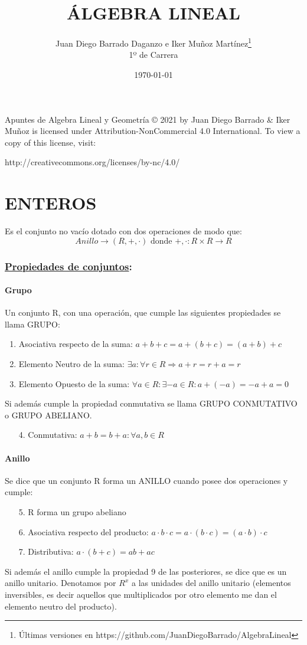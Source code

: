 \documentclass[10pt,a4paper,openright]{book}
\title{ÁLGEBRA LINEAL}
\author{Juan Diego Barrado Daganzo e Iker Muñoz Martínez\footnote{Últimas versiones en https://github.com/JuanDiegoBarrado/AlgebraLineal}\\1º de Carrera} %
\date{\today}
\begin{document}
\maketitle

Apuntes de Algebra Lineal y Geometría © 2021 by Juan Diego Barrado & Iker Muñoz is licensed under Attribution-NonCommercial 4.0 International. To view a copy of this license, visit:
\begin{center}
http://creativecommons.org/licenses/by-nc/4.0/
\end{center}

\mainmatter
\chapter*{ENTEROS}
Es el conjunto no vacío dotado con dos operaciones de modo que:
$$Anillo \rightarrow (R,+,\cdot)\mbox{ donde }+,\cdot : R\times R \rightarrow R$$
\subsection*{\underline{Propiedades de conjuntos}:}
\subsubsection*{Grupo}
Un conjunto R, con una operación, que cumple las siguientes propiedades se llama GRUPO:
\begin{enumerate}
\item Asociativa respecto de la suma: $a+b+c=a+(b+c)=(a+b)+c$
\item Elemento Neutro de la suma: $\exists a : \forall r \in R \Rightarrow a+r=r+a=r$
\item Elemento Opuesto de la suma: $\forall a \in R : \exists -a\in R : a+(-a)=-a+a=0$
\end{enumerate}
Si además cumple la propiedad conmutativa se llama GRUPO CONMUTATIVO o GRUPO ABELIANO.
\begin{enumerate}
\item[4.] Conmutativa: $a+b=b+a: \forall a,b\in R $
\end{enumerate}

\subsubsection*{Anillo}
Se dice que un conjunto R forma un ANILLO cuando posee dos operaciones y cumple:
\begin{enumerate}
\item [5.]R forma un grupo abeliano
\item [6.]Asociativa respecto del producto: $a\cdot b\cdot c=a\cdot(b\cdot c)=(a\cdot b)\cdot c$
\item [7.]Distributiva: $a\cdot(b+c)=ab+ac$
\end{enumerate}
Si además el anillo cumple la propiedad 9 de las posteriores, se dice que es un anillo unitario. Denotamos por $R^{x}$ a las unidades del anillo unitario (elementos inversibles, es decir aquellos que multiplicados por otro elemento me dan el elemento neutro del producto).
\end{document}
